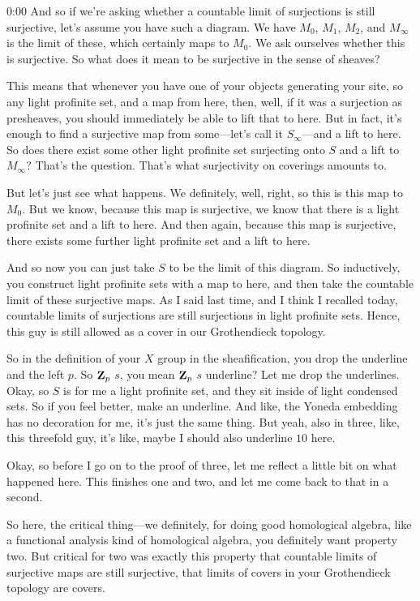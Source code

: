 \begin{unfinished}{0:00}
And so if we're asking whether a countable limit of surjections is still surjective, let's assume you have such a diagram. We have $M_0$, $M_1$, $M_2$, and $M_\infty$ is the limit of these, which certainly maps to $M_0$. We ask ourselves whether this is surjective. So what does it mean to be surjective in the sense of sheaves?

This means that whenever you have one of your objects generating your site, so any light profinite set, and a map from here, then, well, if it was a surjection as presheaves, you should immediately be able to lift that to here. But in fact, it's enough to find a surjective map from some---let's call it $S_\infty$---and a lift to here. So does there exist some other light profinite set surjecting onto $S$ and a lift to $M_\infty$? That's the question. That's what surjectivity on coverings amounts to.

But let's just see what happens. We definitely, well, right, so this is this map to $M_0$. But we know, because this map is surjective, we know that there is a light profinite set and a lift to here. And then again, because this map is surjective, there exists some further light profinite set and a lift to here.

And so now you can just take $S$ to be the limit of this diagram. So inductively, you construct light profinite sets with a map to here, and then take the countable limit of these surjective maps. As I said last time, and I think I recalled today, countable limits of surjections are still surjections in light profinite sets. Hence, this guy is still allowed as a cover in our Grothendieck topology.

So in the definition of your $X$ group in the sheafification, you drop the underline and the left $p$. So $\mathbf Z_p$ $s$, you mean $\mathbf Z_p$ $s$ underline? Let me drop the underlines. Okay, so $S$ is for me a light profinite set, and they sit inside of light condensed sets. So if you feel better, make an underline. And like, the Yoneda embedding has no decoration for me, it's just the same thing. But yeah, also in three, like, this threefold guy, it's like, maybe I should also underline $10$ here.

Okay, so before I go on to the proof of three, let me reflect a little bit on what happened here. This finishes one and two, and let me come back to that in a second.

So here, the critical thing---we definitely, for doing good homological algebra, like a functional analysis kind of homological algebra, you definitely want property two. But critical for two was exactly this property that countable limits of surjective maps are still surjective, that limits of covers in your Grothendieck topology are covers.


\end{unfinished}
